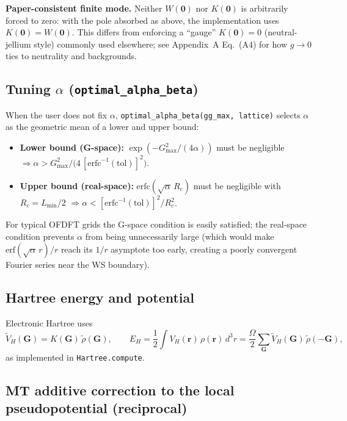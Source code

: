 \documentclass[11pt,a4paper]{article}
\begin{document}
\textbf{Paper-consistent finite mode.}
Neither $W(\mathbf 0)$ nor $K(\mathbf 0)$ is arbitrarily forced to zero: with the pole absorbed as above,
the implementation uses $K(\mathbf 0)=W(\mathbf 0)$.
This differs from enforcing a ``gauge'' $K(\mathbf 0)=0$ (neutral-jellium style) commonly used elsewhere;
see Appendix~A Eq.~(A4) for how $g\to 0$ ties to neutrality and backgrounds.

\subsection{Tuning $\alpha$ (\texttt{optimal\_alpha\_beta})}

When the user does not fix $\alpha$, \texttt{optimal\_alpha\_beta(gg\_max, lattice)}
selects $\alpha$ as the geometric mean of a lower and upper bound:
\begin{itemize}
  \item \textbf{Lower bound (G-space):} $\exp(-G^2_{\max}/(4\alpha))$ must be negligible
        $\Rightarrow \alpha > G^2_{\max}/\bigl(4\,[\mathrm{erfc}^{-1}(\mathrm{tol})]^2\bigr)$.
  \item \textbf{Upper bound (real-space):} $\mathrm{erfc}(\sqrt{\alpha}\,R_c)$ must be
        negligible with $R_c = L_{\min}/2$
        $\Rightarrow \alpha < [\mathrm{erfc}^{-1}(\mathrm{tol})]^2/R_c^2$.
\end{itemize}
For typical OFDFT grids the G-space condition is easily satisfied; the real-space
condition prevents $\alpha$ from being unnecessarily large (which would make
$\mathrm{erf}(\sqrt\alpha\,r)/r$ reach its $1/r$ asymptote too early, creating a
poorly convergent Fourier series near the WS boundary).

\subsection{Hartree energy and potential}

Electronic Hartree uses
\begin{equation}
  \tilde V_H(\mathbf G) = K(\mathbf G)\,\tilde\rho(\mathbf G),
  \qquad
  E_H = \frac{1}{2}\int V_H(\mathbf r)\,\rho(\mathbf r)\,d^3r
      = \frac{\Omega}{2}\sum_{\mathbf G} \tilde V_H(\mathbf G)\,\tilde\rho(-\mathbf G),
\end{equation}
as implemented in \texttt{Hartree.compute}.

\subsection{MT additive correction to the local pseudopotential (reciprocal)}
\end{document}
